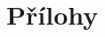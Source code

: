 \documentclass[12pt,a4paper,oneside]{article}
\begin{document}
\newpage
\tableofcontents



















\section{Přílohy} %
\end{document}
